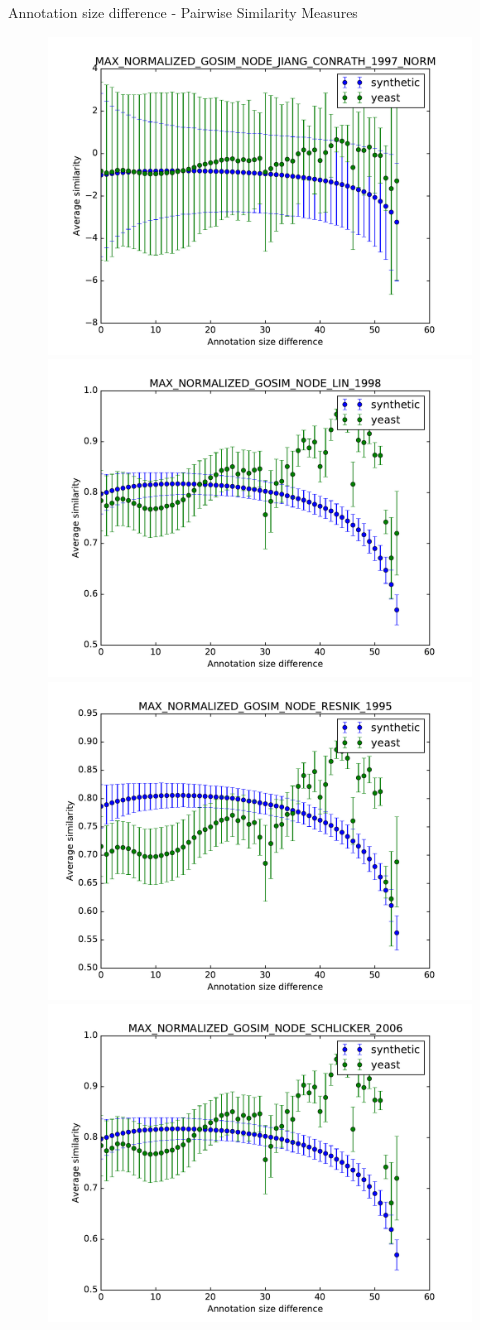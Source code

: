 \documentclass{beamer}
\begin{document}
\begin{frame}{Annotation size difference - Pairwise Similarity Measures}
\begin{figure}
\includegraphics[width=0.5\linewidth, height=0.4\textheight]{pairwise_diff/SIM_GROUPWISE_MAX_NORMALIZED_GOSIM_SIM_PAIRWISE_DAG_NODE_JIANG_CONRATH_1997_NORM_diff.pdf}
\includegraphics[width=0.5\linewidth, height=0.4\textheight]{pairwise_diff/SIM_GROUPWISE_MAX_NORMALIZED_GOSIM_SIM_PAIRWISE_DAG_NODE_LIN_1998_diff.pdf} \\
\includegraphics[width=0.5\linewidth, height=0.4\textheight]{pairwise_diff/SIM_GROUPWISE_MAX_NORMALIZED_GOSIM_SIM_PAIRWISE_DAG_NODE_RESNIK_1995_diff.pdf}
\includegraphics[width=0.5\linewidth, height=0.4\textheight]{pairwise_diff/SIM_GROUPWISE_MAX_NORMALIZED_GOSIM_SIM_PAIRWISE_DAG_NODE_SCHLICKER_2006_diff.pdf}
\end{figure}
\end{frame}
\end{document}
